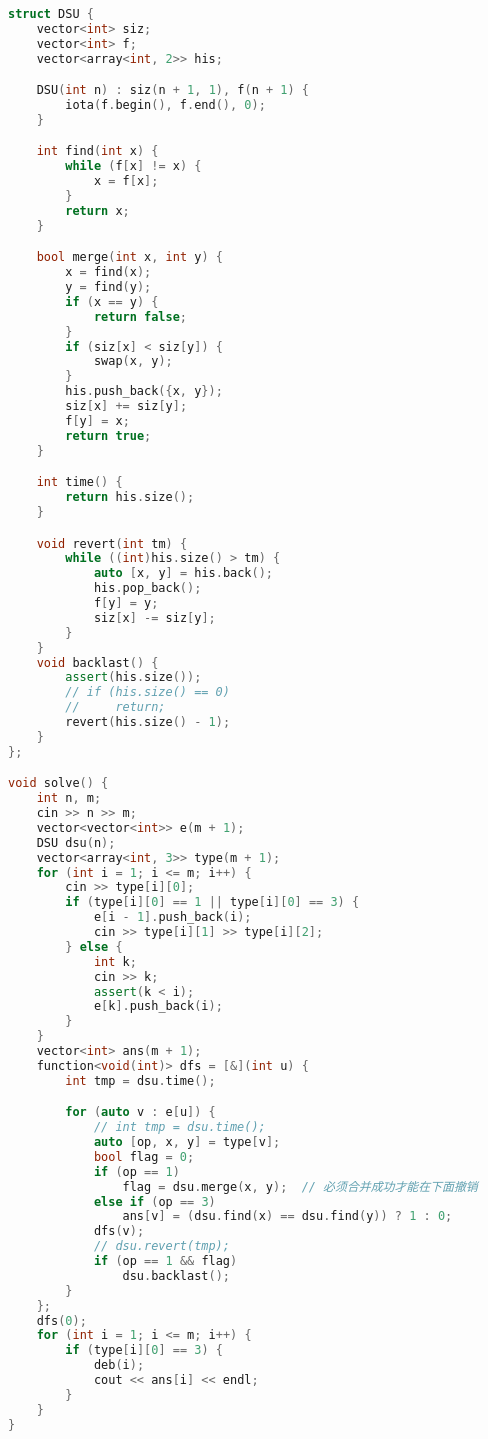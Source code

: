 \begin{lstlisting}[language=C++]
struct DSU {
    vector<int> siz;
    vector<int> f;
    vector<array<int, 2>> his;

    DSU(int n) : siz(n + 1, 1), f(n + 1) {
        iota(f.begin(), f.end(), 0);
    }

    int find(int x) {
        while (f[x] != x) {
            x = f[x];
        }
        return x;
    }

    bool merge(int x, int y) {
        x = find(x);
        y = find(y);
        if (x == y) {
            return false;
        }
        if (siz[x] < siz[y]) {
            swap(x, y);
        }
        his.push_back({x, y});
        siz[x] += siz[y];
        f[y] = x;
        return true;
    }

    int time() {
        return his.size();
    }

    void revert(int tm) {
        while ((int)his.size() > tm) {
            auto [x, y] = his.back();
            his.pop_back();
            f[y] = y;
            siz[x] -= siz[y];
        }
    }
    void backlast() {
        assert(his.size());
        // if (his.size() == 0)
        //     return;
        revert(his.size() - 1);
    }
};

void solve() {
    int n, m;
    cin >> n >> m;
    vector<vector<int>> e(m + 1);
    DSU dsu(n);
    vector<array<int, 3>> type(m + 1);
    for (int i = 1; i <= m; i++) {
        cin >> type[i][0];
        if (type[i][0] == 1 || type[i][0] == 3) {
            e[i - 1].push_back(i);
            cin >> type[i][1] >> type[i][2];
        } else {
            int k;
            cin >> k;
            assert(k < i);
            e[k].push_back(i);
        }
    }
    vector<int> ans(m + 1);
    function<void(int)> dfs = [&](int u) {
        int tmp = dsu.time();

        for (auto v : e[u]) {
            // int tmp = dsu.time();
            auto [op, x, y] = type[v];
            bool flag = 0;
            if (op == 1)
                flag = dsu.merge(x, y);  // 必须合并成功才能在下面撤销
            else if (op == 3)
                ans[v] = (dsu.find(x) == dsu.find(y)) ? 1 : 0;
            dfs(v);
            // dsu.revert(tmp);
            if (op == 1 && flag)
                dsu.backlast();
        }
    };
    dfs(0);
    for (int i = 1; i <= m; i++) {
        if (type[i][0] == 3) {
            deb(i);
            cout << ans[i] << endl;
        }
    }
}
\end{lstlisting}
